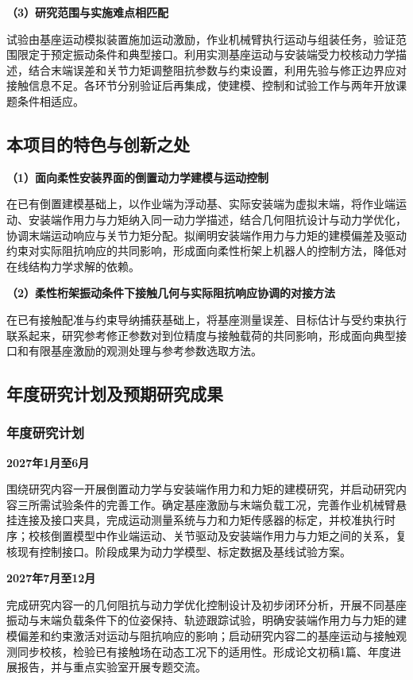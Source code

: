 \documentclass[UTF8,a4paper,zihao=-4,fontset=fandol]{ctexart}
\newcommand{\topic}[1]{\par\addvspace{0.5em}\noindent\textbf{#1}\par\nobreak}
\begin{document}
\topic{（3）研究范围与实施难点相匹配}

试验由基座运动模拟装置施加运动激励，作业机械臂执行运动与组装任务，验证范围限定于预定振动条件和典型接口。利用实测基座运动与安装端受力校核动力学描述，结合末端误差和关节力矩调整阻抗参数与约束设置，利用先验与修正边界应对接触信息不足。各环节分别验证后再集成，使建模、控制和试验工作与两年开放课题条件相适应。

\subsection{本项目的特色与创新之处}

\topic{（1）面向柔性安装界面的倒置动力学建模与运动控制}

在已有倒置建模基础上，以作业端为浮动基、实际安装端为虚拟末端，将作业端运动、安装端作用力与力矩纳入同一动力学描述，结合几何阻抗设计与动力学优化，协调末端运动响应与关节力矩分配。拟阐明安装端作用力与力矩的建模偏差及驱动约束对实际阻抗响应的共同影响，形成面向柔性桁架上机器人的控制方法，降低对在线结构力学求解的依赖。



\topic{（2）柔性桁架振动条件下接触几何与实际阻抗响应协调的对接方法}

在已有接触配准与约束导纳捕获基础上，将基座测量误差、目标估计与受约束执行联系起来，研究参考修正参数对到位精度与接触载荷的共同影响，形成面向典型接口和有限基座激励的观测处理与参考参数选取方法。

\subsection{年度研究计划及预期研究成果}

\subsubsection{年度研究计划}

\topic{2027年1月至6月}
围绕研究内容一开展倒置动力学与安装端作用力和力矩的建模研究，并启动研究内容三所需试验条件的完善工作。确定基座激励与末端负载工况，完善作业机械臂悬挂连接及接口夹具，完成运动测量系统与力和力矩传感器的标定，并校准执行时序；校核倒置模型中作业端运动、关节驱动及安装端作用力与力矩之间的关系，复核现有控制接口。阶段成果为动力学模型、标定数据及基线试验方案。

\topic{2027年7月至12月}
完成研究内容一的几何阻抗与动力学优化控制设计及初步闭环分析，开展不同基座振动与末端负载条件下的位姿保持、轨迹跟踪试验，明确安装端作用力与力矩的建模偏差和约束激活对运动与阻抗响应的影响；启动研究内容二的基座运动与接触观测同步校核，检验已有接触场在动态工况下的适用性。形成论文初稿1篇、年度进展报告，并与重点实验室开展专题交流。
\end{document}
